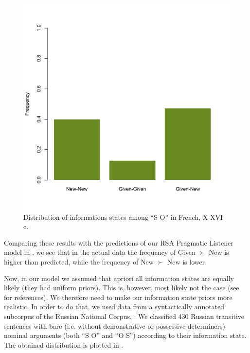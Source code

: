 \documentclass[output=paper,modfonts,nonflat]{langsci/langscibook}
\begin{document}
\begin{figure}
\includegraphics[scale = 0.45]{figures/plotFrenchSbjObj}
\caption{Distribution of informations states among ``S O'' in French, X-XVI c.}\label{figure:corpusSbjObj}
\end{figure}

Comparing these results with the predictions of our RSA Pragmatic Listener model in , we see that in the actual data the frequency of Given $\succ$ New is higher than predicted, while the frequency of New $\succ$ New is lower. 

Now, in our model we assumed that apriori all information states are equally likely (they had uniform priors). This is, however, most likely not the case (see \citet{Birner:2012} for references). We therefore need to make our information state priors more realistic. In order to do that, we used data from a syntactically annotated subcorpus of the Russian National Corpus, \citet{RNC}. We classified 430 Russian transitive sentences with bare (i.e. without demonstrative or possessive determiners) nominal arguments (both ``S O'' and ``O S'') according to their information state. The obtained distribution is plotted in .
\end{document}

